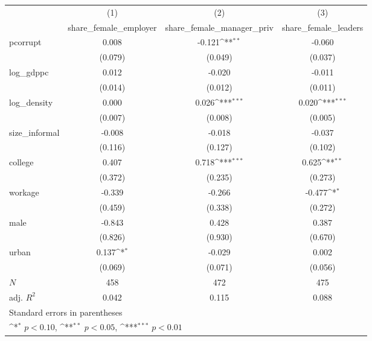 {
\def\sym#1{\ifmmode^{#1}\else\(^{#1}\)\fi}
\begin{tabular}{l*{3}{c}}
\hline\hline
            &\multicolumn{1}{c}{(1)}&\multicolumn{1}{c}{(2)}&\multicolumn{1}{c}{(3)}\\
            &\multicolumn{1}{c}{share\_female\_employer}&\multicolumn{1}{c}{share\_female\_manager\_priv}&\multicolumn{1}{c}{share\_female\_leaders}\\
\hline
pcorrupt    &       0.008         &      -0.121\sym{**} &      -0.060         \\
            &     (0.079)         &     (0.049)         &     (0.037)         \\
[1em]
log\_gdppc   &       0.012         &      -0.020         &      -0.011         \\
            &     (0.014)         &     (0.012)         &     (0.011)         \\
[1em]
log\_density &       0.000         &       0.026\sym{***}&       0.020\sym{***}\\
            &     (0.007)         &     (0.008)         &     (0.005)         \\
[1em]
size\_informal&      -0.008         &      -0.018         &      -0.037         \\
            &     (0.116)         &     (0.127)         &     (0.102)         \\
[1em]
college     &       0.407         &       0.718\sym{***}&       0.625\sym{**} \\
            &     (0.372)         &     (0.235)         &     (0.273)         \\
[1em]
workage     &      -0.339         &      -0.266         &      -0.477\sym{*}  \\
            &     (0.459)         &     (0.338)         &     (0.272)         \\
[1em]
male        &      -0.843         &       0.428         &       0.387         \\
            &     (0.826)         &     (0.930)         &     (0.670)         \\
[1em]
urban       &       0.137\sym{*}  &      -0.029         &       0.002         \\
            &     (0.069)         &     (0.071)         &     (0.056)         \\
\hline
\(N\)       &         458         &         472         &         475         \\
adj. \(R^{2}\)&       0.042         &       0.115         &       0.088         \\
\hline\hline
\multicolumn{4}{l}{\footnotesize Standard errors in parentheses}\\
\multicolumn{4}{l}{\footnotesize \sym{*} \(p<0.10\), \sym{**} \(p<0.05\), \sym{***} \(p<0.01\)}\\
\end{tabular}
}
